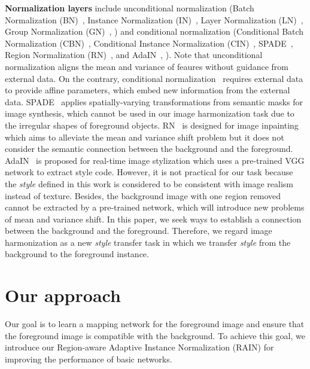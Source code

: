 \documentclass[final]{cvpr}
\begin{document}
\medskip
\noindent
\textbf{Normalization layers} include unconditional normalization (Batch Normalization (BN)~\cite{ioffe2015batch}, Instance Normalization (IN)~\cite{ulyanov2016instance}, Layer Normalization (LN)~\cite{ba2016layer}, Group Normalization (GN)~\cite{wu2018group}, \etc) and conditional normalization (Conditional Batch Normalization (CBN)~\cite{de2017modulating}, Conditional Instance Normalization (CIN)~\cite{dumoulin2016learned}, SPADE~\cite{park2019semantic}, Region Normalization (RN)~\cite{yu2020region}, and AdaIN~\cite{huang2017arbitrary}, \etc). Note that unconditional normalization aligns the mean and variance of feaures without guidance from external data. On the contrary, conditional normalization~\cite{de2017modulating,dumoulin2016learned,huang2017arbitrary,park2019semantic} requires external data to provide affine parameters, which embed new information from the external data. SPADE~\cite{park2019semantic} applies spatially-varying transformations from semantic masks for image synthesis, which cannot be used in our image harmonization task due to the irregular shapes of foreground objects. RN~\cite{yu2020region} is designed for image inpainting which aims to alleviate the mean and variance shift problem but it does not consider the semantic connection between the background and the foreground. AdaIN~\cite{huang2017arbitrary} is proposed for real-time image stylization which uses a pre-trained VGG network to extract style code. However, it is not practical for our task because the \emph{style} defined in this work is considered to be consistent with image realism instead of texture. Besides, the background image with one region removed cannot be extracted by a pre-trained network, which will introduce new problems of mean and variance shift. In this paper, we seek ways to establish a connection between the background and the foreground. Therefore, we regard image harmonization as a new \emph{style} transfer task in which we transfer \emph{style} from the background to the foreground instance. 

\section{Our approach}
\label{sec:approach}
Our goal is to learn a mapping network for the foreground image and ensure that the foreground image is compatible with the background. To achieve this goal, we introduce our Region-aware Adaptive Instance Normalization (RAIN) for improving the performance of basic networks. 
\end{document}
